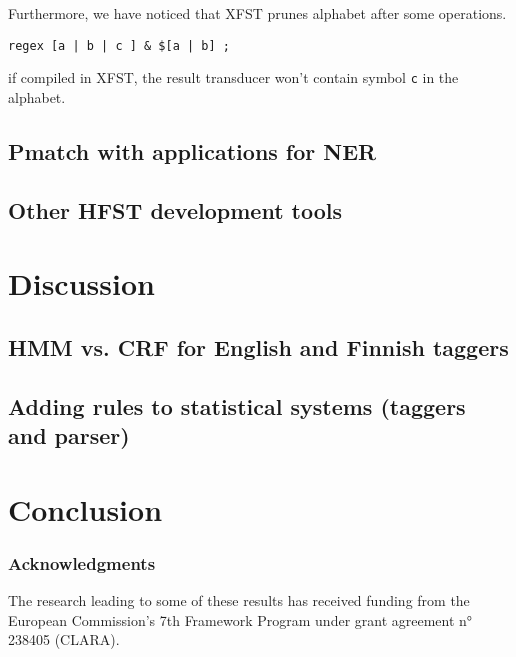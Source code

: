 \documentclass{llncs}
\begin{document}
Furthermore, we have noticed that XFST prunes alphabet after some operations.

\begin{verbatim}
regex [a | b | c ] & $[a | b] ;
\end{verbatim}
if compiled in XFST, the result transducer won't contain symbol \verb+c+
in the alphabet.

\subsection{Pmatch with applications for NER}

\subsection{Other HFST development tools}

\section{Discussion}\label{hfst:discussion}

\subsection{HMM vs. CRF for English and Finnish taggers}

\subsection{Adding rules to statistical systems (taggers and parser)}

\section{Conclusion}\label{hfst:conclusion}

\subsubsection*{Acknowledgments}
The research leading to some of these results has received funding from the
European Commission's 7th Framework Program under grant agreement n° 238405 (CLARA).




\end{document}
